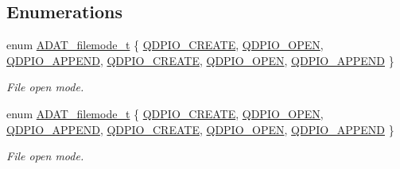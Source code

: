 \subsection*{Enumerations}
\begin{DoxyCompactItemize}
\item 
enum \mbox{\hyperlink{group__qio_ga669520ca9003997be838730beef322b4}{A\+D\+A\+T\+\_\+filemode\+\_\+t}} \{ \newline
\mbox{\hyperlink{group__qio_gga669520ca9003997be838730beef322b4a977eb79b8f4ae7cfd75c9dbcc992b84f}{Q\+D\+P\+I\+O\+\_\+\+C\+R\+E\+A\+TE}}, 
\mbox{\hyperlink{group__qio_gga669520ca9003997be838730beef322b4a6dd4c4da4f92babb9ab4c28f4aa13231}{Q\+D\+P\+I\+O\+\_\+\+O\+P\+EN}}, 
\mbox{\hyperlink{group__qio_gga669520ca9003997be838730beef322b4aae9e16570c37ba9ace5529d3bc48b9a8}{Q\+D\+P\+I\+O\+\_\+\+A\+P\+P\+E\+ND}}, 
\mbox{\hyperlink{group__qio_gga669520ca9003997be838730beef322b4a977eb79b8f4ae7cfd75c9dbcc992b84f}{Q\+D\+P\+I\+O\+\_\+\+C\+R\+E\+A\+TE}}, 
\newline
\mbox{\hyperlink{group__qio_gga669520ca9003997be838730beef322b4a6dd4c4da4f92babb9ab4c28f4aa13231}{Q\+D\+P\+I\+O\+\_\+\+O\+P\+EN}}, 
\mbox{\hyperlink{group__qio_gga669520ca9003997be838730beef322b4aae9e16570c37ba9ace5529d3bc48b9a8}{Q\+D\+P\+I\+O\+\_\+\+A\+P\+P\+E\+ND}}
 \}
\begin{DoxyCompactList}\small\item\em File open mode. \end{DoxyCompactList}\item 
enum \mbox{\hyperlink{group__qio_ga669520ca9003997be838730beef322b4}{A\+D\+A\+T\+\_\+filemode\+\_\+t}} \{ \newline
\mbox{\hyperlink{group__qio_gga669520ca9003997be838730beef322b4a977eb79b8f4ae7cfd75c9dbcc992b84f}{Q\+D\+P\+I\+O\+\_\+\+C\+R\+E\+A\+TE}}, 
\mbox{\hyperlink{group__qio_gga669520ca9003997be838730beef322b4a6dd4c4da4f92babb9ab4c28f4aa13231}{Q\+D\+P\+I\+O\+\_\+\+O\+P\+EN}}, 
\mbox{\hyperlink{group__qio_gga669520ca9003997be838730beef322b4aae9e16570c37ba9ace5529d3bc48b9a8}{Q\+D\+P\+I\+O\+\_\+\+A\+P\+P\+E\+ND}}, 
\mbox{\hyperlink{group__qio_gga669520ca9003997be838730beef322b4a977eb79b8f4ae7cfd75c9dbcc992b84f}{Q\+D\+P\+I\+O\+\_\+\+C\+R\+E\+A\+TE}}, 
\newline
\mbox{\hyperlink{group__qio_gga669520ca9003997be838730beef322b4a6dd4c4da4f92babb9ab4c28f4aa13231}{Q\+D\+P\+I\+O\+\_\+\+O\+P\+EN}}, 
\mbox{\hyperlink{group__qio_gga669520ca9003997be838730beef322b4aae9e16570c37ba9ace5529d3bc48b9a8}{Q\+D\+P\+I\+O\+\_\+\+A\+P\+P\+E\+ND}}
 \}
\begin{DoxyCompactList}\small\item\em File open mode. \end{DoxyCompactList}\end{DoxyCompactItemize}
